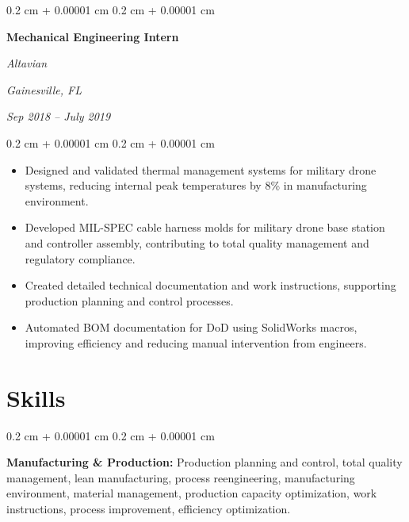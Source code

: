 \documentclass[10pt, letterpaper]{article}
\newenvironment{highlights}{
    \begin{itemize}[
        topsep=0.10 cm,
        parsep=0.10 cm,
        partopsep=0pt,
        itemsep=0pt,
        leftmargin=0.4 cm + 10pt
    ]
}{
    \end{itemize}
} %
\newenvironment{onecolentry}{
    \begin{adjustwidth}{
        0.2 cm + 0.00001 cm
    }{
        0.2 cm + 0.00001 cm
    }
}{
    \end{adjustwidth}
} %
\newenvironment{twocolentry}[2][]{
    \onecolentry
    \def\secondColumn{#2}
    \setcolumnwidth{\fill, 4.5 cm}
    \begin{paracol}{2}
}{
    \switchcolumn \raggedleft \secondColumn
    \end{paracol}
    \endonecolentry
} %
\begin{document}
        \vspace{0.35 cm}

        \begin{twocolentry}{
        \textit{Gainesville, FL}    
            
        \textit{Sep 2018 – July 2019}}
            \textbf{Mechanical Engineering Intern}
            
            \textit{Altavian}
        \end{twocolentry}

        \vspace{0.10 cm}
        \begin{onecolentry}
            \begin{highlights}
                \item Designed and validated thermal management systems for military drone systems, reducing internal peak temperatures by 8\% in manufacturing environment.
                \item Developed MIL-SPEC cable harness molds for military drone base station and controller assembly, contributing to total quality management and regulatory compliance.
                \item Created detailed technical documentation and work instructions, supporting production planning and control processes.
                \item Automated BOM documentation for DoD using SolidWorks macros, improving efficiency and reducing manual intervention from engineers.
            \end{highlights}
        \end{onecolentry}


\vspace{0.4 cm}


    
    \section{Skills}


        \begin{onecolentry}
            \textbf{Manufacturing \& Production:} Production planning and control, total quality management, lean manufacturing, process reengineering, manufacturing environment, material management, production capacity optimization, work instructions, process improvement, efficiency optimization.
        \end{onecolentry}

        \vspace{0.2 cm}
\end{document}
